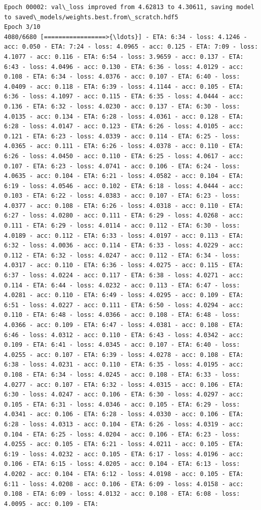\documentclass[11pt]{article}
\begin{document}
\begin{Verbatim}[commandchars=\\\{\}]
Epoch 00002: val\_loss improved from 4.62813 to 4.30611, saving model to saved\_models/weights.best.from\_scratch.hdf5
Epoch 3/10
4080/6680 [=================>{\ldots}] - ETA: 6:34 - loss: 4.1246 - acc: 0.050 - ETA: 7:24 - loss: 4.0965 - acc: 0.125 - ETA: 7:09 - loss: 4.1077 - acc: 0.116 - ETA: 6:54 - loss: 3.9659 - acc: 0.137 - ETA: 6:43 - loss: 4.0496 - acc: 0.130 - ETA: 6:36 - loss: 4.0129 - acc: 0.108 - ETA: 6:34 - loss: 4.0376 - acc: 0.107 - ETA: 6:40 - loss: 4.0409 - acc: 0.118 - ETA: 6:39 - loss: 4.1144 - acc: 0.105 - ETA: 6:36 - loss: 4.1097 - acc: 0.115 - ETA: 6:35 - loss: 4.0444 - acc: 0.136 - ETA: 6:32 - loss: 4.0230 - acc: 0.137 - ETA: 6:30 - loss: 4.0135 - acc: 0.134 - ETA: 6:28 - loss: 4.0361 - acc: 0.128 - ETA: 6:28 - loss: 4.0147 - acc: 0.123 - ETA: 6:26 - loss: 4.0105 - acc: 0.121 - ETA: 6:23 - loss: 4.0339 - acc: 0.114 - ETA: 6:25 - loss: 4.0365 - acc: 0.111 - ETA: 6:26 - loss: 4.0378 - acc: 0.110 - ETA: 6:26 - loss: 4.0450 - acc: 0.110 - ETA: 6:25 - loss: 4.0617 - acc: 0.107 - ETA: 6:23 - loss: 4.0741 - acc: 0.106 - ETA: 6:24 - loss: 4.0635 - acc: 0.104 - ETA: 6:21 - loss: 4.0582 - acc: 0.104 - ETA: 6:19 - loss: 4.0546 - acc: 0.102 - ETA: 6:18 - loss: 4.0444 - acc: 0.103 - ETA: 6:22 - loss: 4.0383 - acc: 0.107 - ETA: 6:23 - loss: 4.0377 - acc: 0.108 - ETA: 6:26 - loss: 4.0318 - acc: 0.110 - ETA: 6:27 - loss: 4.0280 - acc: 0.111 - ETA: 6:29 - loss: 4.0268 - acc: 0.111 - ETA: 6:29 - loss: 4.0114 - acc: 0.112 - ETA: 6:30 - loss: 4.0189 - acc: 0.112 - ETA: 6:33 - loss: 4.0197 - acc: 0.113 - ETA: 6:32 - loss: 4.0036 - acc: 0.114 - ETA: 6:33 - loss: 4.0229 - acc: 0.112 - ETA: 6:32 - loss: 4.0247 - acc: 0.112 - ETA: 6:34 - loss: 4.0317 - acc: 0.110 - ETA: 6:36 - loss: 4.0275 - acc: 0.115 - ETA: 6:37 - loss: 4.0224 - acc: 0.117 - ETA: 6:38 - loss: 4.0271 - acc: 0.114 - ETA: 6:44 - loss: 4.0232 - acc: 0.113 - ETA: 6:47 - loss: 4.0281 - acc: 0.110 - ETA: 6:49 - loss: 4.0295 - acc: 0.109 - ETA: 6:51 - loss: 4.0227 - acc: 0.111 - ETA: 6:50 - loss: 4.0294 - acc: 0.110 - ETA: 6:48 - loss: 4.0366 - acc: 0.108 - ETA: 6:48 - loss: 4.0366 - acc: 0.109 - ETA: 6:47 - loss: 4.0381 - acc: 0.108 - ETA: 6:46 - loss: 4.0312 - acc: 0.110 - ETA: 6:43 - loss: 4.0342 - acc: 0.109 - ETA: 6:41 - loss: 4.0345 - acc: 0.107 - ETA: 6:40 - loss: 4.0255 - acc: 0.107 - ETA: 6:39 - loss: 4.0278 - acc: 0.108 - ETA: 6:38 - loss: 4.0231 - acc: 0.110 - ETA: 6:35 - loss: 4.0195 - acc: 0.108 - ETA: 6:34 - loss: 4.0245 - acc: 0.108 - ETA: 6:33 - loss: 4.0277 - acc: 0.107 - ETA: 6:32 - loss: 4.0315 - acc: 0.106 - ETA: 6:30 - loss: 4.0247 - acc: 0.106 - ETA: 6:30 - loss: 4.0297 - acc: 0.105 - ETA: 6:31 - loss: 4.0346 - acc: 0.105 - ETA: 6:29 - loss: 4.0341 - acc: 0.106 - ETA: 6:28 - loss: 4.0330 - acc: 0.106 - ETA: 6:28 - loss: 4.0313 - acc: 0.104 - ETA: 6:26 - loss: 4.0319 - acc: 0.104 - ETA: 6:25 - loss: 4.0204 - acc: 0.106 - ETA: 6:23 - loss: 4.0255 - acc: 0.105 - ETA: 6:21 - loss: 4.0211 - acc: 0.105 - ETA: 6:19 - loss: 4.0232 - acc: 0.105 - ETA: 6:17 - loss: 4.0196 - acc: 0.106 - ETA: 6:15 - loss: 4.0205 - acc: 0.104 - ETA: 6:13 - loss: 4.0202 - acc: 0.104 - ETA: 6:12 - loss: 4.0198 - acc: 0.105 - ETA: 6:11 - loss: 4.0208 - acc: 0.106 - ETA: 6:09 - loss: 4.0158 - acc: 0.108 - ETA: 6:09 - loss: 4.0132 - acc: 0.108 - ETA: 6:08 - loss: 4.0095 - acc: 0.109 - ETA: 
\end{Verbatim}
\end{document}
